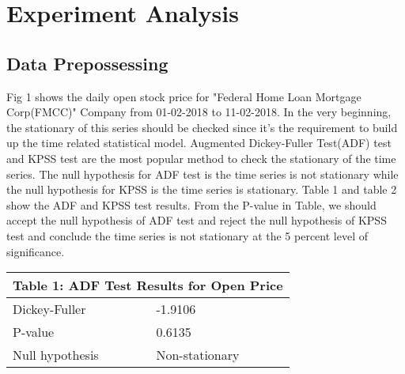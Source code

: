 \section{Experiment Analysis}


\subsection{Data Prepossessing}
Fig 1 shows the daily open stock price for "Federal Home Loan Mortgage Corp(FMCC)" Company from 01-02-2018 to 11-02-2018. In the very beginning, the stationary of this series should be checked since it's the requirement to build up the time related statistical model. Augmented Dickey-Fuller Test(ADF) test and KPSS test are the most popular method to check the stationary of the time series. The null hypothesis  for ADF test is the time series is not stationary  while the null hypothesis for KPSS is the time series is stationary.  Table 1 and table 2 show the ADF and KPSS test results. From the P-value in Table, we should accept the null hypothesis of ADF test and reject the null hypothesis of KPSS test and conclude the time series is not stationary at the 5 percent level of significance.

\begin{table}[]
\centering
\begin{tabular}{|l|l|l|l|l|}
\hline
\multicolumn{5}{|l|}{Table 1: ADF Test Results for Open Price}                 \\ \hline
\multicolumn{3}{|l|}{Dickey-Fuller}          & \multicolumn{2}{l|}{-1.9106}    \\ \hline
\multicolumn{3}{|l|}{P-value}                & \multicolumn{2}{l|}{0.6135}     \\ \hline
\multicolumn{3}{|l|}{Null hypothesis} & \multicolumn{2}{l|}{Non-stationary} \\ \hline
\end{tabular}
\end{table}

